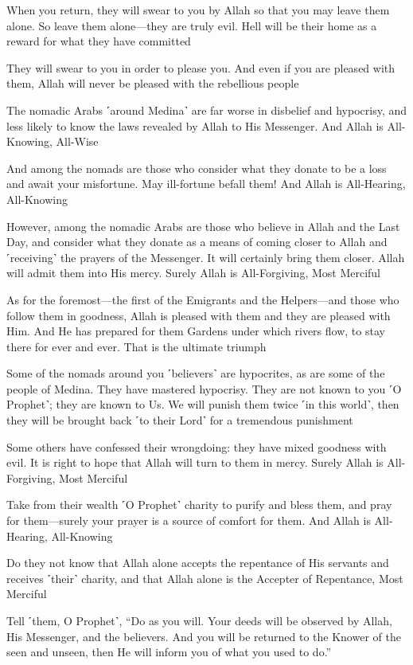 When you return, they will swear to you by Allah so that you may leave them alone. So leave them alone—they are truly evil. Hell will be their home as a reward for what they have committed

They will swear to you in order to please you. And even if you are pleased with them, Allah will never be pleased with the rebellious people

The nomadic Arabs ˹around Medina˺ are far worse in disbelief and hypocrisy, and less likely to know the laws revealed by Allah to His Messenger. And Allah is All-Knowing, All-Wise

And among the nomads are those who consider what they donate to be a loss and await your misfortune. May ill-fortune befall them! And Allah is All-Hearing, All-Knowing

However, among the nomadic Arabs are those who believe in Allah and the Last Day, and consider what they donate as a means of coming closer to Allah and ˹receiving˺ the prayers of the Messenger. It will certainly bring them closer. Allah will admit them into His mercy. Surely Allah is All-Forgiving, Most Merciful

As for the foremost—the first of the Emigrants and the Helpers—and those who follow them in goodness, Allah is pleased with them and they are pleased with Him. And He has prepared for them Gardens under which rivers flow, to stay there for ever and ever. That is the ultimate triumph

Some of the nomads around you ˹believers˺ are hypocrites, as are some of the people of Medina. They have mastered hypocrisy. They are not known to you ˹O Prophet˺; they are known to Us. We will punish them twice ˹in this world˺, then they will be brought back ˹to their Lord˺ for a tremendous punishment

Some others have confessed their wrongdoing: they have mixed goodness with evil. It is right to hope that Allah will turn to them in mercy. Surely Allah is All-Forgiving, Most Merciful

Take from their wealth ˹O Prophet˺ charity to purify and bless them, and pray for them—surely your prayer is a source of comfort for them. And Allah is All-Hearing, All-Knowing

Do they not know that Allah alone accepts the repentance of His servants and receives ˹their˺ charity, and that Allah alone is the Accepter of Repentance, Most Merciful

Tell ˹them, O Prophet˺, “Do as you will. Your deeds will be observed by Allah, His Messenger, and the believers. And you will be returned to the Knower of the seen and unseen, then He will inform you of what you used to do.”

